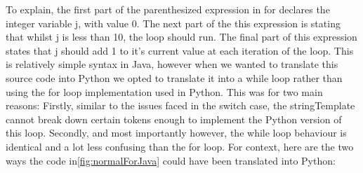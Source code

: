 \documentclass{l4proj}
\begin{document}
To explain, the first part of the parenthesized expression in for declares the integer variable j, with value 0. The next part of the this expression is stating that whilst j is less than 10, the loop should run. The final part of this expression states that j should add 1 to it's current value at each iteration of the loop.
This is relatively simple syntax in Java, however when we wanted to translate this source code into Python we opted to translate it into a while loop rather than using the for loop implementation used in Python. This was for two main reasons: Firstly, similar to the issues faced in the switch case, the stringTemplate cannot break down certain tokens enough to implement the Python version of this loop. Secondly, and most importantly however, the while loop behaviour is identical and a lot less confusing than the for loop. For context, here are the two ways the code in\ref{fig:normalForJava} could have been translated into Python:
\end{document}
